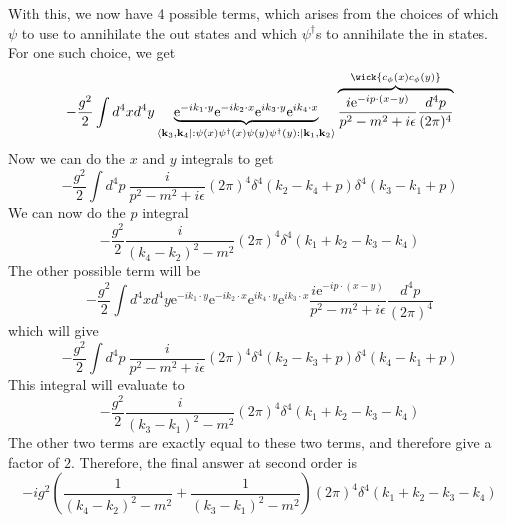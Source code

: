 \documentclass[11pt, notitlepage]{report}
\newcommand{\e}{\mathrm{e}}
\newcommand{\normord}[1]{:\mathrel{#1}:}
\renewcommand{\c}[1]{c_\mathbf{#1}}
\numberwithin{equation}{section}
\begin{document}
    With this, we now have 4 possible terms, which arises from the choices of which \(\psi\) to use to annihilate the out states and which \(\psi^\dagger\)s to annihilate the in states. For one such choice, we get 
    \begin{equation*}
        -\frac{g^2}{2} \int d^4x d^4y \underbrace{\e^{-ik_1\cdot y}\e^{-ik_2\cdot x}\e^{ik_3\cdot y}\e^{ik_4\cdot x}}_{\bra{\textbf{k}_3, \textbf{k}_4}\normord{\psi(x) \psi^\dagger(x) \psi(y) \psi^\dagger(y)}\ket{\textbf{k}_1, \textbf{k}_2}}  
        \overbrace{\frac{i\e^{-ip\cdot(x-y)}}{p^2 -m^2 + i\epsilon}\frac{d^4p}{(2\pi)^4}}^{ \wick{\c\phi(x)\c\phi(y)} }
    \end{equation*}
    Now we can do the \(x\) and \(y\) integrals to get 
    \begin{equation*}
        -\frac{g^2}{2} \int d^4p~
       \frac{i}{p^2 -m^2 + i\epsilon}(2\pi)^4\delta^4(k_2 - k_4 + p) \delta^4(k_3 - k_1 + p)
    \end{equation*}
    We can now do the \(p\) integral
    \begin{equation*}
        -\frac{g^2}{2} \frac{i}{(k_4-k_2)^2 - m^2} (2\pi)^4 \delta^4(k_1 + k_2 - k_3 - k_4)
    \end{equation*}
    The other possible term will be 
    \begin{equation*}
        -\frac{g^2}{2} \int d^4x d^4y\e^{-ik_1\cdot y}\e^{-ik_2\cdot x}\e^{ik_4\cdot y}\e^{ik_3\cdot x}\frac{i\e^{-ip\cdot(x-y)}}{p^2 -m^2 + i\epsilon}\frac{d^4p}{(2\pi)^4}
    \end{equation*}
    which will give 
    \begin{equation*}
         -\frac{g^2}{2} \int d^4p~  \frac{i}{p^2 -m^2 + i\epsilon}(2\pi)^4\delta^4(k_2 - k_3 + p) \delta^4(k_4 - k_1 + p)
    \end{equation*}
    This integral will evaluate to 
    \begin{equation*}
        -\frac{g^2}{2} \frac{i}{(k_3-k_1)^2 - m^2} (2\pi)^4 \delta^4(k_1 + k_2 - k_3 - k_4)
    \end{equation*}    
    The other two terms are exactly equal to these two terms, and therefore give a factor of \(2\). Therefore, the final answer at second order is 
    \begin{equation*}
        -ig^2 \left(  \frac{1}{(k_4-k_2)^2 - m^2}  +   \frac{1}{(k_3-k_1)^2 - m^2}  \right)(2\pi)^4 \delta^4(k_1 + k_2 - k_3 - k_4)
    \end{equation*}
\end{document}
